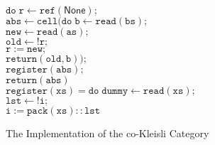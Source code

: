 \documentclass[preprint]{sigplanconf}
\newcommand{\term}[1]{\ensuremath{\mathtt{{#1}}}}
\newcommand{\None}{\mathsf{None}}
\begin{document}
\begin{figure}
\begin{tabbing}
\>           \>    \> \qquad\term{do\;}\=
                                      \term{r \leftarrow ref(\None);} \\
\>           \>    \>               \>\term{abs \leftarrow cell(do\;}\=\term{b \leftarrow read(bs);} \\
\>           \>    \>               \>                               \>\term{new \leftarrow read(as);} \\
\>           \>    \>               \>                               \>\term{old \leftarrow !r;}\\
\>           \>    \>               \>                               \>\term{r := new;}\\
\>           \>    \>               \>                               \>\term{return(old,b));}\\
\>           \>    \>               \>\term{register(abs);} \\
\>           \>    \>               \>\term{return(abs)} 
\\[1em]

\term{register(xs) = do\;}\=\term{dummy \leftarrow read(xs);}\\
                          \>\term{lst \leftarrow !i;} \\
                          \>\term{i := pack(xs) :: lst} 
\end{tabbing}
\caption{The Implementation of the co-Kleisli Category}
\label{cokleisli-implementation}
\end{figure}
\end{document}
